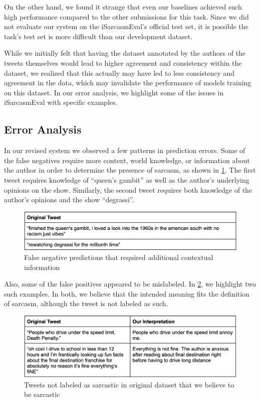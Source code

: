 \documentclass[11pt]{article}
\begin{document}
On the other hand, we found it strange that even our baselines achieved such high performance compared to the other submissions for this task. Since we did not evaluate our system on the iSarcasmEval’s official test set, it is possible the task’s test set is more difficult than our development dataset.

While we initially felt that having the dataset annotated by the authors of the tweets themselves would lead to higher agreement and consistency within the dataset, we realized that this actually may have led to less consistency and agreement in the data, which may invalidate the performance of models training on this dataset. In our error analysis, we highlight some of the issues in iSarcasmEval with specific examples. 

\subsection{Error Analysis}

In our revised system we observed a few patterns in prediction errors. Some of the false negatives require more context, world knowledge, or information about the author in order to determine the presence of sarcasm, as shown in \ref{table:false-neg}. The first tweet requires knowledge of “queen’s gambit” as well as the author’s underlying opinions on the show. Similarly, the second tweet requires both knowledge of the author’s opinions and the show “degrassi”. 

\begin{figure}[h!]
    \includegraphics[width=.5\textwidth]{Picture10.png}
    \caption{False negative predictions that required additional contextual information}
    \label{table:false-neg}
\end{figure}


Also, some of the false positives appeared to be mislabeled. In \ref{table:tweets-not-labeled}, we highlight two such examples. In both, we believe that the intended meaning fits the definition of sarcasm, although the tweet is not labeled as such.

\begin{figure}[h!]
    \includegraphics[width=.5\textwidth]{Picture11.png}
    \caption{Tweets not labeled as sarcastic in original dataset that we believe to be sarcastic}
    \label{table:tweets-not-labeled}
\end{figure}
\end{document}
